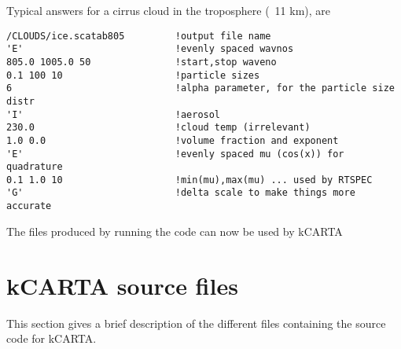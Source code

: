 \documentclass[12pt]{article}
\newcommand{\kc}{\textsf{kCARTA}\xspace}
\begin{document}
Typical answers for a cirrus cloud in the troposphere (~11 km), are
\begin{verbatim}
/CLOUDS/ice.scatab805         !output file name
'E'                           !evenly spaced wavnos
805.0 1005.0 50               !start,stop waveno
0.1 100 10                    !particle sizes
6                             !alpha parameter, for the particle size distr
'I'                           !aerosol   
230.0                         !cloud temp (irrelevant)
1.0 0.0                       !volume fraction and exponent
'E'                           !evenly spaced mu (cos(x)) for quadrature
0.1 1.0 10                    !min(mu),max(mu) ... used by RTSPEC
'G'                           !delta scale to make things more accurate
\end{verbatim}

The files produced by running the code can now be used by \kc

\section{\kc source files}
This section gives a brief description of the different files containing the
source code for \kc.
\end{document}
